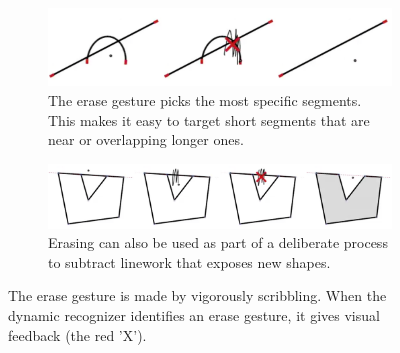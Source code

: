 \begin{figure}
  \centering
  \begin{subfigure}[t]{0.7\textwidth}
    \includegraphics[width=\linewidth]{img/erase-basic.pdf}
    \caption{The erase gesture picks the most specific segments. This
      makes it easy to target short segments that are near or
      overlapping longer ones.}
    \label{fig:erase-basic}
  \end{subfigure}
  \vspace{5mm}

  \begin{subfigure}[t]{0.7\textwidth}
    \includegraphics[width=\linewidth]{img/erase-cutout.pdf}
    \caption{Erasing can also be used as part of a deliberate process
      to subtract linework that exposes new shapes.}
    \label{fig:erase-cutout}
  \end{subfigure}
  \caption[Erase Gesture]{The erase gesture is made by vigorously
    scribbling. When the dynamic recognizer identifies an erase
    gesture, it gives visual feedback (the red 'X').}
  \label{fig:erase}
\end{figure}
